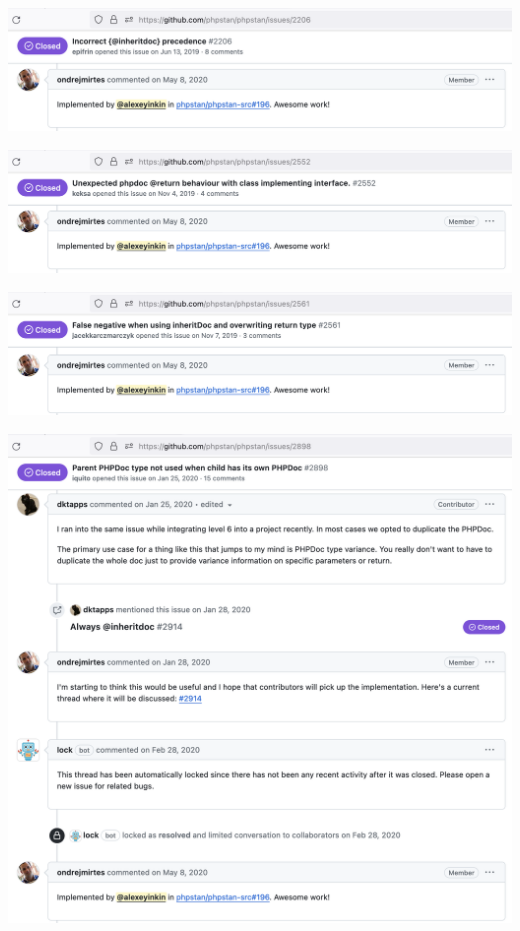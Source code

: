 \includegraphics[width=\textwidth]{issue-2206}

\includegraphics[width=\textwidth]{issue-2552}
\pagebreak

\includegraphics[width=\textwidth]{issue-2561}

\includegraphics[width=\textwidth]{issue-2898}
\pagebreak

